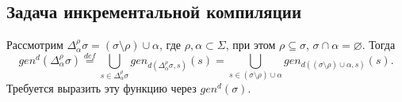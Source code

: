 \subsection{Задача инкрементальной компиляции}

\newcommand{\Deltasigma}{\Delta_\alpha^\rho\sigma}
Рассмотрим $\Deltasigma = (\sigma \setminus \rho) \cup \alpha$, где $\rho, \alpha \subset \Sigma$, при этом $\rho \subseteq \sigma$, $\sigma \cap \alpha = \varnothing$. Тогда
$$gen^d(\Deltasigma) \overset{def}{=} \bigcup\limits_{s \in \Deltasigma} gen_{d(\Deltasigma, s)}(s) = \bigcup\limits_{s \in (\sigma \setminus \rho) \cup \alpha} gen_{d((\sigma \setminus \rho) \cup \alpha, s)}(s).$$
Требуется выразить эту функцию через $gen^d(\sigma)$.